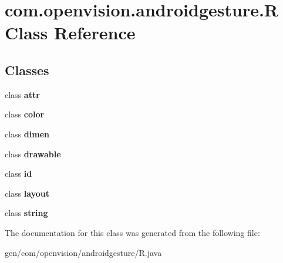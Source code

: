 \hypertarget{classcom_1_1openvision_1_1androidgesture_1_1R}{\section{com.\-openvision.\-androidgesture.\-R \-Class \-Reference}
\label{classcom_1_1openvision_1_1androidgesture_1_1R}
}
\subsection*{\-Classes}
\begin{DoxyCompactItemize}
\item 
class {\bfseries attr}
\item 
class {\bfseries color}
\item 
class {\bfseries dimen}
\item 
class {\bfseries drawable}
\item 
class {\bfseries id}
\item 
class {\bfseries layout}
\item 
class {\bfseries string}
\end{DoxyCompactItemize}


\-The documentation for this class was generated from the following file\-:\begin{DoxyCompactItemize}
\item 
gen/com/openvision/androidgesture/\-R.\-java\end{DoxyCompactItemize}

